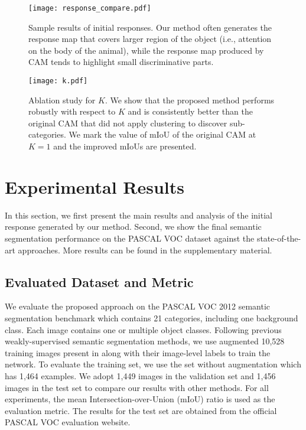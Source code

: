\documentclass[10pt,twocolumn,letterpaper]{article}
\begin{document}
\begin{figure*}[t]
	\centering
	\texttt{[image: response\_compare.pdf]}\\
\caption{Sample results of initial responses. 
Our method often generates the response map that covers larger region of the object (i.e., attention on the body of the animal), while the response map produced by CAM \cite{zhou2016learning} tends to highlight small discriminative parts.}
	\label{fig: cam_viz}
	\vspace{-1mm}
\end{figure*}


\begin{figure}[!t]
	\centering
	\texttt{[image: k.pdf]}\\
	\vspace{-1mm}
	\caption{Ablation study for $K$. We show that the proposed method performs robustly with respect to $K$ and is consistently better than the original CAM that did not apply clustering to discover sub-categories. We mark the value of mIoU of the original CAM at $K = 1$ and the improved mIoUs are presented.}
	\label{fig: k}
	\vspace{-3mm}
\end{figure}



\section{Experimental Results}
In this section, we first present the main results and analysis of the initial response generated by our method.
Second, we show the final semantic segmentation performance on the PASCAL VOC dataset \cite{PASCAL_VOC_2010_Data} against the state-of-the-art approaches.
More results can be found in the supplementary material. 

\subsection{Evaluated Dataset and Metric}
We evaluate the proposed approach on the PASCAL VOC 2012 semantic segmentation benchmark \cite{PASCAL_VOC_2010_Data} which contains 21 categories, including one background class. 
Each image contains one or multiple object classes. Following previous weakly-supervised semantic segmentation methods, we use augmented 10,528 training images present in \cite{hariharan2011semantic} along with their image-level labels to train the network. 
To evaluate the training set, we use the set without augmentation which has 1,464 examples. 
We adopt 1,449 images in the validation set and 1,456 images in the test set to compare our results with other methods. 
For all experiments, the mean Intersection-over-Union (mIoU) ratio is used as the evaluation metric. 
The results for the test set are obtained from the official PASCAL VOC evaluation website.
\end{document}
